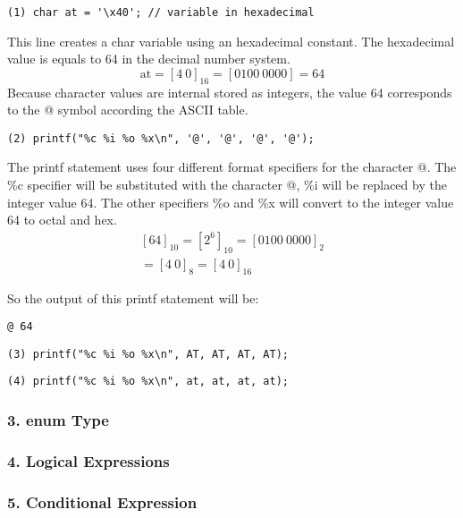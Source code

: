 \documentclass[12pt]{article}
\begin{document}
\begin{lstlisting}
(1) char at = '\x40'; // variable in hexadecimal
\end{lstlisting}
This line creates a char variable using an hexadecimal constant. The hexadecimal value is equals to 64 in the decimal number system.
\begin{equation}
\text{at} = [4 \: 0]_{16} = [0100 \: 0000] = 64
\end{equation} 
Because character values are internal stored as integers, the value 64 corresponds to the @ symbol according the ASCII table.

\begin{lstlisting}
(2) printf("%c %i %o %x\n", '@', '@', '@', '@');
\end{lstlisting}
The printf statement uses four different format specifiers for the character @.
The \%c specifier will be substituted with the character @, \%i will be replaced by the integer value 64. The other specifiers \%o and \%x will convert to the integer value 64 to octal and hex. 
\begin{equation}
\begin{split}
{[64]}_{10} = {[2^6]}_{10} = {[0100 \: 0000]}_2 \\
= [4 \: 0]_{8} =[4 \: 0]_{16}
\end{split}
\end{equation}

So the output of this printf statement will be:

\begin{lstlisting}
@ 64 
\end{lstlisting}


\begin{lstlisting}
(3) printf("%c %i %o %x\n", AT, AT, AT, AT);
\end{lstlisting}


\begin{lstlisting}
(4) printf("%c %i %o %x\n", at, at, at, at);
\end{lstlisting}


\subsubsection*{3. enum Type}

\subsubsection*{4. Logical Expressions}

\subsubsection*{5. Conditional Expression}
\end{document}
